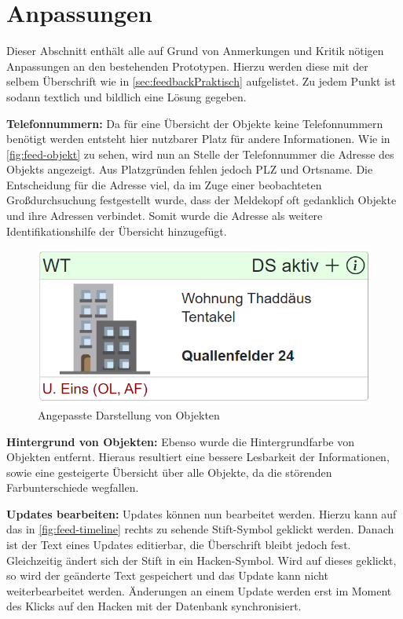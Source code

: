 \section{Anpassungen}\label{sec:anpassungen}

Dieser Abschnitt enthält alle auf Grund von Anmerkungen und Kritik nötigen Anpassungen an den bestehenden Prototypen.
Hierzu werden diese mit der selbem Überschrift wie in \autoref{sec:feedbackPraktisch} aufgelistet.
Zu jedem Punkt ist sodann textlich und bildlich eine Lösung gegeben.

\textbf{Telefonnummern:} Da für eine Übersicht der Objekte keine Telefonnummern benötigt werden entsteht hier nutzbarer Platz für andere Informationen.
Wie in \autoref{fig:feed-objekt} zu sehen, wird nun an Stelle der Telefonnummer die Adresse des Objekts angezeigt.
Aus Platzgründen fehlen jedoch PLZ und Ortsname.
Die Entscheidung für die Adresse viel, da im Zuge einer beobachteten Großdurchsuchung festgestellt wurde, dass der Meldekopf oft gedanklich Objekte und ihre Adressen verbindet.
Somit wurde die Adresse als weitere Identifikationshilfe der Übersicht hinzugefügt.

\begin{figure}[htp]
    \centering
    \includegraphics[width=.7\textwidth]{images/4-Feedback/objekt.png}
    \caption{Angepasste Darstellung von Objekten}
    \label{fig:feed-objekt}
\end{figure}

\textbf{Hintergrund von Objekten:} Ebenso wurde die Hintergrundfarbe von Objekten entfernt.
Hieraus resultiert eine bessere Lesbarkeit der Informationen, sowie eine gesteigerte Übersicht über alle Objekte, da die störenden Farbunterschiede wegfallen.

\textbf{Updates bearbeiten:} Updates können nun bearbeitet werden.
Hierzu kann auf das in \autoref{fig:feed-timeline} rechts zu sehende Stift-Symbol geklickt werden.
Danach ist der Text eines Updates editierbar, die Überschrift bleibt jedoch fest.
Gleichzeitig ändert sich der Stift in ein Hacken-Symbol.
Wird auf dieses geklickt, so wird der geänderte Text gespeichert und das Update kann nicht weiterbearbeitet werden.
Änderungen an einem Update werden erst im Moment des Klicks auf den Hacken mit der Datenbank synchronisiert.

